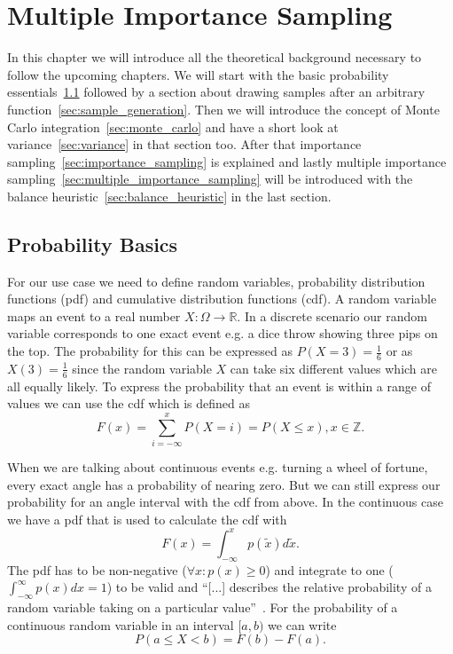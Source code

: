 \chapter{Multiple Importance Sampling}
\label{ch:mis}
In this chapter we will introduce all the theoretical background necessary to follow the upcoming chapters.
We will start with the basic probability essentials~\ref{sec:probability_basics}
followed by a section about drawing samples after an arbitrary function~\ref{sec:sample_generation}.
Then we will introduce the concept of Monte Carlo integration~\ref{sec:monte_carlo}
and have a short look at variance~\ref{sec:variance} in that section too.
After that importance sampling~\ref{sec:importance_sampling} is explained
and lastly multiple importance sampling~\ref{sec:multiple_importance_sampling} will be introduced
with the balance heuristic~\ref{sec:balance_heuristic} in the last section.

\section{Probability Basics}
\label{sec:probability_basics}
For our use case we need to define random variables, probability distribution functions (pdf) and cumulative distribution functions (cdf).
A random variable maps an event to a real number $ X: \Omega \to \mathbb{R} $.
In a discrete scenario our random variable corresponds to one exact event e.g. a dice throw showing three pips on the top.
The probability for this can be expressed as $ P(X = 3) = \frac{1}{6} $ or as $ X(3) = \frac{1}{6} $
since the random variable $ X $ can take six different values which are all equally likely.
To express the probability that an event is within a range of values we can use the cdf
which is defined as $$ F(x) = \sum_{i = -\infty}^x P(X = i) = P(X \leq x), x \in \mathbb{Z}. $$

When we are talking about continuous events e.g. turning a wheel of fortune, every exact angle has a probability of nearing zero.
But we can still express our probability for an angle interval with the cdf from above.
In the continuous case we have a pdf that is used to calculate the cdf with $$ F(x) = \int_{-\infty}^x p(\tilde{x}) d\tilde{x}. $$
The pdf has to be non-negative ($ \forall x: p(x) \geq 0 $) and integrate to one ($ \int_{-\infty}^{\infty} p(x) dx = 1$) to be valid and
\enquote{[...] describes the relative probability of a random variable taking on a particular value}~\cite[Chapter~13.1]{pbr-book}.
For the probability of a continuous random variable in an interval $ [a, b) $ we can write $$ P(a \leq X < b) = F(b) - F(a). $$


